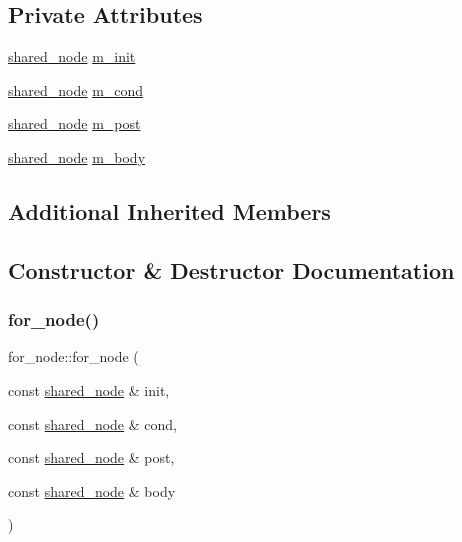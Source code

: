 \subsection*{Private Attributes}
\begin{DoxyCompactItemize}
\item 
\hyperlink{namespacejawe_a3f307481d921b6cbb50cc8511fc2b544}{shared\+\_\+node} \hyperlink{classjawe_1_1for__node_a3ede0b1860eb521ca4d3e0eef422bde9}{m\+\_\+init}
\item 
\hyperlink{namespacejawe_a3f307481d921b6cbb50cc8511fc2b544}{shared\+\_\+node} \hyperlink{classjawe_1_1for__node_a5b1999ad9e78b7d3773a6c1b8f74006f}{m\+\_\+cond}
\item 
\hyperlink{namespacejawe_a3f307481d921b6cbb50cc8511fc2b544}{shared\+\_\+node} \hyperlink{classjawe_1_1for__node_a3fe75e2c277af21538197a39a496492b}{m\+\_\+post}
\item 
\hyperlink{namespacejawe_a3f307481d921b6cbb50cc8511fc2b544}{shared\+\_\+node} \hyperlink{classjawe_1_1for__node_a64c9d22116feeae7c5a8f712483c2ad2}{m\+\_\+body}
\end{DoxyCompactItemize}
\subsection*{Additional Inherited Members}


\subsection{Constructor \& Destructor Documentation}
\mbox{\label{classjawe_1_1for__node_a720114bf0a3a54234f0440b28bee76ac}} 
\subsubsection{\texorpdfstring{for\+\_\+node()}{for\_node()}}
{\footnotesize\ttfamily for\+\_\+node\+::for\+\_\+node (\begin{DoxyParamCaption}\item[{const \hyperlink{namespacejawe_a3f307481d921b6cbb50cc8511fc2b544}{shared\+\_\+node} \&}]{init,  }\item[{const \hyperlink{namespacejawe_a3f307481d921b6cbb50cc8511fc2b544}{shared\+\_\+node} \&}]{cond,  }\item[{const \hyperlink{namespacejawe_a3f307481d921b6cbb50cc8511fc2b544}{shared\+\_\+node} \&}]{post,  }\item[{const \hyperlink{namespacejawe_a3f307481d921b6cbb50cc8511fc2b544}{shared\+\_\+node} \&}]{body }\end{DoxyParamCaption})}



